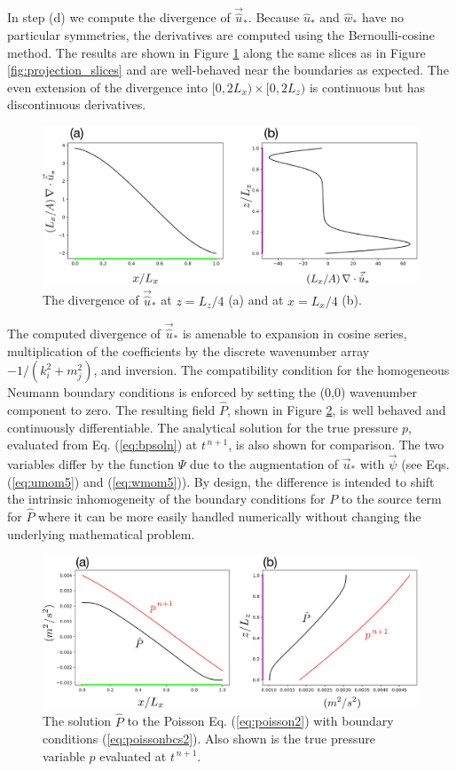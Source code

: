 \documentclass{jfm-like}
\begin{document}
In step (d) we compute the divergence of ${\vec {\hat u}_*}$. Because ${\hat u}_*$ and ${\hat w}_*$ have no particular symmetries, the derivatives are computed using the Bernoulli-cosine method. The results are shown 
in Figure \ref{fig:divustarhat} along the same slices
as in Figure \ref{fig:projection_slices} and are well-behaved near the boundaries as expected. The even extension of the divergence into $[0,2L_x) \times [0,2L_z)$ is continuous but has discontinuous derivatives. 
 \begin{figure}
  \centerline{\includegraphics[width=1.0\textwidth]{FIGS/divustarhat.eps}}
  \caption{The divergence of ${\vec {\hat u}_*}$ at $z=L_z/4$ (a) and at $x=L_x/4$ (b). }
  \label{fig:divustarhat}
\end{figure}

The computed divergence of ${\vec {\hat u}_*}$ is amenable
to expansion in cosine series,  multiplication of the coefficients by the discrete wavenumber array $-1/(k_i^2+m_j^2)$, and inversion. The compatibility condition for the homogeneous Neumann boundary conditions
is enforced by setting the (0,0) wavenumber component to zero. The resulting field ${\hat P}$, shown in Figure \ref{fig:phat_p}, is well behaved and continuously differentiable. The  analytical solution for the true pressure $p$, evaluated from Eq. (\ref{eq:bpsoln}) at $t^{\,n+1}$, is also shown for comparison. The two variables differ by the function $\Psi$ due to the augmentation of ${\vec u}_*$ with $\vec \psi$ (see Eqs. (\ref{eq:umom5}) and  (\ref{eq:wmom5})). By design, the difference
is intended to shift the intrinsic inhomogeneity of the boundary conditions for $P$ to the source term for ${\hat P}$ where it can be more easily handled numerically without changing the underlying mathematical problem.
 \begin{figure}
  \centerline{\includegraphics[width=1.0\textwidth]{FIGS/phat_p.eps}}
  \caption{The solution ${\hat P}$ to the Poisson Eq. (\ref{eq:poisson2}) with boundary conditions (\ref{eq:poissonbcs2}). Also shown is  the true pressure variable $p$ evaluated at $t^{\,n+1}$.
  }
  \label{fig:phat_p}
\end{figure}
\end{document}
